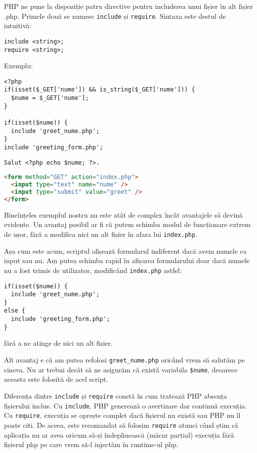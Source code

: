 PHP ne pune la dispoziție patru directive pentru includerea unui fișier în
alt fișier .php. Primele două se numesc \texttt{include} și \texttt{require}.
Sintaxa este destul de intuitivă:
\begin{verbatim}
include <string>;
require <string>;
\end{verbatim}

Exemplu:
\begin{lstlisting}[title=index.php]
<?php
if(isset($_GET['nume']) && is_string($_GET['nume'])) {
  $nume = $_GET['nume'];
}

if(isset($nume)) {
  include 'greet_nume.php';
}
include 'greeting_form.php';
\end{lstlisting}
\begin{lstlisting}[title=greet\_nume.php]
Salut <?php echo $nume; ?>.
\end{lstlisting}
\begin{lstlisting}[title=greeting\_form.php,language=html]
<form method="GET" action="index.php">
  <input type="text" name="nume" />
  <input type="submit" value="greet" />
</form>
\end{lstlisting}

Bineînțeles exemplul nostru nu este atât de complex încât 
avantajele să devină evidente. Un avantaj posibil ar fi că putem schimba modul
de funcționare extrem de ușor, fără a modifica nici un alt
fișier în afara lui \texttt{index.php}.

Așa cum este acum, scriptul afișează formularul indiferent
dacă avem numele ca input sau nu. Am putea schimba rapid în afișarea
formularului doar dacă numele nu a fost trimis de utilizator, modificând
\texttt{index.php} astfel:
\begin{lstlisting}[title=index.php,firstnumber=6]
if(isset($nume)) {
  include 'greet_nume.php';
}
else {
  include 'greeting_form.php';
}
\end{lstlisting}
fără a ne atinge de nici un alt fișier.

Alt avantaj e că am putea refolosi \texttt{greet\_nume.php} oricând
vrem să salutăm pe cineva. Nu ar trebui decât să ne asigurăm că există variabila
\texttt{\$nume}, deoarece aceasta este folosită de acel script.

Diferența dintre \texttt{include} și \texttt{require} constă în cum
tratează PHP absența fișierului inclus. Cu \texttt{include}, PHP generează
o avertizare dar continuă execuția. Cu \texttt{require}, execuția se oprește
complet dacă fișierul nu există sau PHP nu îl poate citi. De aceea,
este recomandat să folosim \texttt{require} atunci când știm că aplicația
nu ar avea oricum să-și îndeplinească (măcar parțial) execuția fără
fișierul php pe care vrem să-l injectăm în runtime-ul php.

